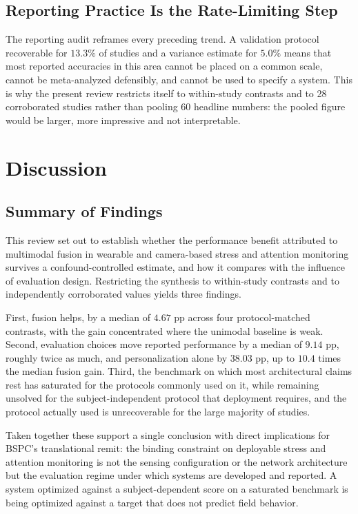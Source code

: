 \documentclass[11pt,a4paper]{article}
\begin{document}
\subsection{Reporting Practice Is the Rate-Limiting Step}
The reporting audit reframes every preceding trend. A validation protocol recoverable for
$13.3\%$ of studies and a variance estimate for $5.0\%$ means that most reported accuracies
in this area cannot be placed on a common scale, cannot be meta-analyzed defensibly, and
cannot be used to specify a system. This is why the present review restricts itself to
within-study contrasts and to 28 corroborated studies rather than pooling 60 headline
numbers: the pooled figure would be larger, more impressive and not interpretable.

\section{Discussion}

\subsection{Summary of Findings}
This review set out to establish whether the performance benefit attributed to multimodal
fusion in wearable and camera-based stress and attention monitoring survives a
confound-controlled estimate, and how it compares with the influence of evaluation design.
Restricting the synthesis to within-study contrasts and to independently corroborated values
yields three findings.

First, fusion helps, by a median of $4.67$ pp across four protocol-matched contrasts, with
the gain concentrated where the unimodal baseline is weak. Second, evaluation choices move
reported performance by a median of $9.14$ pp, roughly twice as much, and personalization
alone by $38.03$ pp, up to $10.4$ times the median fusion gain. Third, the benchmark on which
most architectural claims rest has saturated for the protocols commonly used on it, while
remaining unsolved for the subject-independent protocol that deployment requires, and the
protocol actually used is unrecoverable for the large majority of studies.

Taken together these support a single conclusion with direct implications for BSPC's
translational remit: the binding constraint on deployable stress and attention monitoring is
not the sensing configuration or the network architecture but the evaluation regime under
which systems are developed and reported. A system optimized against a subject-dependent
score on a saturated benchmark is being optimized against a target that does not predict
field behavior.
\end{document}
